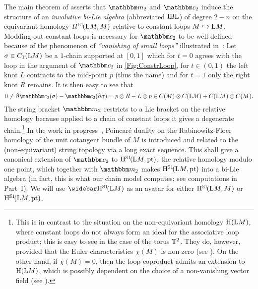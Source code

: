 \documentclass[\MainFolder/Text.tex]{subfiles}
\begin{document}
The main theorem of \cite{Sullivan2002} asserts that $\StringOp_2$ and $\StringCoOp_2$ induce the structure of an \emph{involutive bi-Lie algebra} (abbreviated $\mathrm{IBL}$) of degree $2-n$ on the equivariant homology $H^{\mathbb{S}{1}}\!(\mathrm{L} M,M)$ relative to constant loops $M\xhookrightarrow{}\mathrm{L} M$. Modding out constant loops is necessary for $\StringCoOp_2$ to be well defined because of the phenomenon of \emph{``vanishing of small loops''} illustrated in~\cite{Cieliebak2007}:  Let $\sigma\in C_1(\mathrm{L} M)$ be a $1$-chain supported at $[0,1]$ which for $t=0$ agrees with the loop in the argument of $\StringCoOp_2$ in \ref{Fig:ConstrLoop}, for $t\in (0,1)$ the left knot $L$ contracts to the mid-point $p$ (thus the name) and for $t=1$ only the right knot $R$ remains. It is then easy to see that 
\[ 0 \neq \Bdd \StringCoOp_2(\sigma) - \StringCoOp_2(\Bdd \sigma) = p\otimes R - L \otimes p \in C(M)\otimes C(\Loop M) + C(\Loop M)\otimes C(M). \]
The string bracket $\StringOp_2$ restricts to a Lie bracket on the relative homology because applied to a chain of constant loops it gives a degenerate chain.\footnote{This is in contrast to the situation on the non-equivariant homology $\mathrm{H}(\mathrm{L} M)$, where constant loops do not always form an ideal for the associative loop product; this is easy to see in the case of the torus $\mathbb{T}^2$. They do, however, provided that the Euler characteristics $\chi(M)$ is non-zero (see \cite{Tamanoi2010}). On the other hand, if $\chi(M)=0$, then the loop coproduct admits an extension to $\mathrm{H}(\mathrm{L} M)$, which is possibly dependent on the choice of a non-vanishing vector field (see \cite{Basu2011}).}
In the work in progress~\cite{CieliebakHingston2018}, Poincar\'e duality on the Rabinowitz-Floer homology of the unit cotangent bundle of $M$ is introduced and related to the (non-equivariant) string topology via a long exact sequence. This shall give a canonical extension of $\StringCoOp_2$ to $\mathrm{H}^{\mathbb{S}{1}}\!(\mathrm{L} M,\mathrm{pt})$, the relative homology modulo one point, which together with $\StringOp_2$ makes $\mathrm{H}^{\mathbb{S}{1}}\!(\mathrm{L} M,\mathrm{pt})$ into a bi-Lie algebra (in fact, this is what our chain model computes; see computations in Part~I). We will use $\RedEquivHom(\Loop M)$ as an avatar for either $\mathrm{H}^{\mathbb{S}{1}}\!(\mathrm{L} M,M)$ or $\mathrm{H}^{\mathbb{S}{1}}\!(\mathrm{L} M,\mathrm{pt})$.
\end{document}
